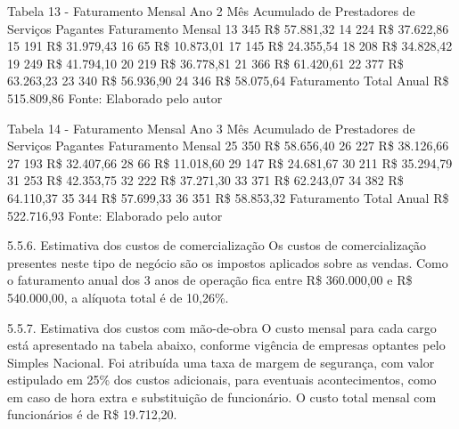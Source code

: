 Tabela 13 - Faturamento Mensal Ano 2 
Mês	Acumulado de Prestadores de Serviços Pagantes	Faturamento Mensal
13	345	R\$     57.881,32
14	224	R\$     37.622,86
15	191	R\$     31.979,43
16	65	R\$     10.873,01
17	145	R\$     24.355,54
18	208	R\$     34.828,42
19	249	R\$     41.794,10
20	219	R\$     36.778,81
21	366	R\$     61.420,61
22	377	R\$     63.263,23
23	340	R\$     56.936,90
24	346	R\$     58.075,64
Faturamento Total Anual	R\$  515.809,86
Fonte: Elaborado pelo autor 

Tabela 14 - Faturamento Mensal Ano 3 
Mês	Acumulado de Prestadores de Serviços Pagantes	Faturamento Mensal
25	350	R\$     58.656,40
26	227	R\$     38.126,66
27	193	R\$     32.407,66
28	66	R\$     11.018,60
29	147	R\$     24.681,67
30	211	R\$     35.294,79
31	253	R\$     42.353,75
32	222	R\$     37.271,30
33	371	R\$     62.243,07
34	382	R\$     64.110,37
35	344	R\$     57.699,33
36	351	R\$     58.853,32
Faturamento Total Anual	R\$  522.716,93
Fonte: Elaborado pelo autor 

5.5.6. Estimativa dos custos de comercialização 
Os custos de comercialização presentes neste tipo de negócio são os impostos aplicados sobre as vendas. Como o faturamento anual dos 3 anos de operação fica entre R\$ 360.000,00 e R\$ 540.000,00, a alíquota total é de 10,26\%. 

5.5.7. Estimativa dos custos com mão-de-obra 
O custo mensal para cada cargo está apresentado na tabela abaixo, conforme vigência de empresas optantes pelo Simples Nacional. Foi atribuída uma taxa de margem de segurança, com valor estipulado em 25\% dos custos adicionais, para eventuais acontecimentos, como em caso de hora extra e substituição de funcionário. 
O custo total mensal com funcionários é de R\$ 19.712,20. 

